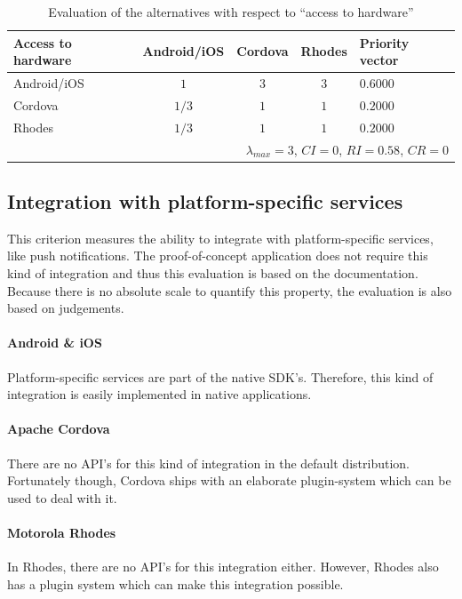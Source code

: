 \begin{table}[h!]
    \centering
    \begin{tabular}{lcccl}
        \hline
        \textbf{Access to hardware} & Android/iOS & Cordova & Rhodes & Priority vector \\
        \hline
        Android/iOS                 & $1$         & $3$     & $3$   & $0.6000$         \\
        Cordova                     & $1/3$       & $1$     & $1$   & $0.2000$         \\
        Rhodes                      & $1/3$       & $1$     & $1$   & $0.2000$         \\
        \hline
        \multicolumn{5}{r}{$\lambda_{max} = 3$, $CI = 0$, $RI = 0.58$, $CR = 0$}       \\
        \hline
    \end{tabular}
    \caption{Evaluation of the alternatives with respect to ``access to hardware''}
    \label{tab:hwaccess}
\end{table}

\subsection{Integration with platform-specific services}

This criterion measures the ability to integrate with platform-specific services, like push notifications. The proof-of-concept application does not require this kind of integration and thus this evaluation is based on the documentation. Because there is no absolute scale to quantify this property, the evaluation is also based on judgements.

\paragraph{Android \& iOS} Platform-specific services are part of the native SDK's. Therefore, this kind of integration is easily implemented in native applications.

\paragraph{Apache Cordova} There are no API's for this kind of integration in the default distribution. Fortunately though, Cordova ships with an elaborate plugin-system which can be used to deal with it.

\paragraph{Motorola Rhodes} In Rhodes, there are no API's for this integration either. However, Rhodes also has a plugin system which can make this integration possible. 

